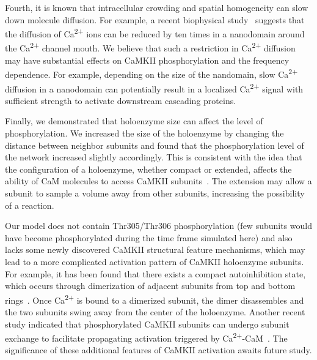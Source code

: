 \documentclass[10pt,letterpaper]{article}
\begin{document}
Fourth, it is known that intracellular crowding and spatial homogeneity can slow down molecule diffusion. For example, a recent biophysical study~\cite{2013PNAS..11015794T} suggests that the diffusion of Ca\textsuperscript{2+} ions can be reduced by ten times in a nanodomain around the Ca\textsuperscript{2+} channel mouth. We believe that such a restriction in Ca\textsuperscript{2+} diffusion may have substantial effects on CaMKII phosphorylation and the frequency dependence. For example, depending on the size of the nandomain, slow Ca\textsuperscript{2+} diffusion in a nanodomain can potentially result in a localized Ca\textsuperscript{2+} signal with sufficient strength to activate downstream cascading proteins. 

Finally, we demonstrated that holoenzyme size can affect the level of phosphorylation. We increased the size of the holoenzyme by changing the distance between neighbor subunits and found that the phosphorylation level of the network increased slightly accordingly. This is consistent with the idea that the configuration of a holoenzyme, whether compact or extended, affects the ability of CaM molecules to access CaMKII subunits~\cite{Stratton:2013el}. The extension may allow a subunit to sample a volume away from other subunits, increasing the possibility of a reaction.

Our model does not contain Thr305/Thr306 phosphorylation (few subunits would have become phosphorylated during the time frame simulated here) and also lacks some newly discovered CaMKII structural feature mechanisms, which may lead to a more complicated activation pattern of CaMKII holoenzyme subunits. For example, it has been found that there exists a compact autoinhibition state, which occurs through dimerization of adjacent subunits from top and bottom rings~\cite{Chao:2010fn}. Once Ca\textsuperscript{2+} is bound to a dimerized subunit, the dimer disassembles and the two subunits swing away from the center of the holoenzyme. Another recent study indicated that phosphorylated CaMKII subunits can undergo subunit exchange to facilitate propagating activation triggered by Ca\textsuperscript{2+}-CaM~\cite{Stratton:2014ct}. The significance of these additional features of CaMKII activation awaits future study.
\end{document}
